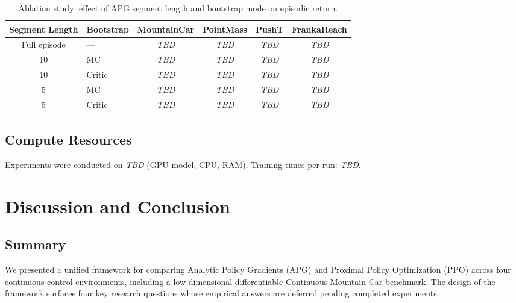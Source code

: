 \documentclass[11pt,a4paper]{article}
\newcommand{\tbd}{\textit{TBD}}
\begin{document}
\begin{table}[htbp]
  \centering
  \caption{Ablation study: effect of APG segment length and bootstrap mode on episodic return.}
  \label{tab:ablation_seg}
  \small
  \begin{tabular}{@{}clcccc@{}}
    \toprule
    \textbf{Segment Length} & \textbf{Bootstrap} & \textbf{MountainCar} & \textbf{PointMass} & \textbf{PushT} & \textbf{FrankaReach} \\
    \midrule
    Full episode & ---       & \tbd & \tbd & \tbd & \tbd \\
    10           & MC        & \tbd & \tbd & \tbd & \tbd \\
    10           & Critic    & \tbd & \tbd & \tbd & \tbd \\
    5            & MC        & \tbd & \tbd & \tbd & \tbd \\
    5            & Critic    & \tbd & \tbd & \tbd & \tbd \\
    \bottomrule
  \end{tabular}
\end{table}

\subsection{Compute Resources}
\label{sec:compute}

Experiments were conducted on \tbd{} (GPU model, CPU, RAM). Training times per run: \tbd{}.

\section{Discussion and Conclusion}
\label{sec:conclusion}

\subsection{Summary}
\label{sec:summary}

We presented a unified framework for comparing Analytic Policy Gradients (APG) and Proximal Policy Optimization (PPO) across four continuous-control environments, including a low-dimensional differentiable Continuous Mountain Car benchmark. The design of the framework surfaces four key research questions whose empirical answers are deferred pending completed experiments:

\end{document}
